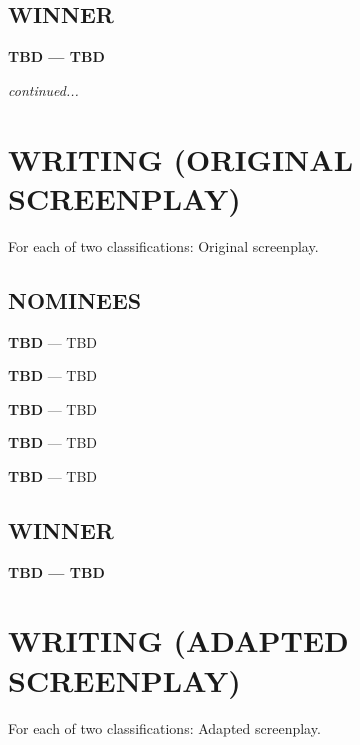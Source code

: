 \documentclass[letterpaper]{extarticle}
\begin{document}
  \subsection*{{\selectfont WINNER}}
  \textcolor{oscaryellow}{\textbf{{\selectfont TBD} — TBD}}

  \mbox{}
  \vfill
  \textit{continued...}

  \newpage

  \section*{\textcolor{oscaryellow}{{\selectfont WRITING (ORIGINAL SCREENPLAY)}}}
  \vspace{-6pt}
  {\selectfont For each of two classifications: Original screenplay.}
  \subsection*{{\selectfont NOMINEES}}
  \begin{multicols}{2}
    \begin{itemize}
      \begin{small}
        \item \textbf{{\selectfont TBD}} — TBD
        \item \textbf{{\selectfont TBD}} — TBD
        \item \textbf{{\selectfont TBD}} — TBD
        \item \textbf{{\selectfont TBD}} — TBD
        \item \textbf{{\selectfont TBD}} — TBD
      \end{small}
    \end{itemize}
  \end{multicols}

  \subsection*{{\selectfont WINNER}}
  \textcolor{oscaryellow}{\textbf{{\selectfont TBD} — TBD}}

  \section*{\textcolor{oscaryellow}{{\selectfont WRITING (ADAPTED SCREENPLAY)}}}
  \vspace{-6pt}
  {\selectfont For each of two classifications: Adapted screenplay.}
\end{document}
